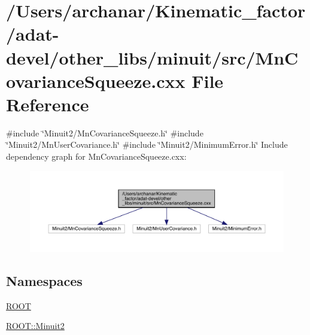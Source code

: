 \hypertarget{adat-devel_2other__libs_2minuit_2src_2MnCovarianceSqueeze_8cxx}{}\section{/\+Users/archanar/\+Kinematic\+\_\+factor/adat-\/devel/other\+\_\+libs/minuit/src/\+Mn\+Covariance\+Squeeze.cxx File Reference}
\label{adat-devel_2other__libs_2minuit_2src_2MnCovarianceSqueeze_8cxx}
{\ttfamily \#include \char`\"{}Minuit2/\+Mn\+Covariance\+Squeeze.\+h\char`\"{}}\newline
{\ttfamily \#include \char`\"{}Minuit2/\+Mn\+User\+Covariance.\+h\char`\"{}}\newline
{\ttfamily \#include \char`\"{}Minuit2/\+Minimum\+Error.\+h\char`\"{}}\newline
Include dependency graph for Mn\+Covariance\+Squeeze.\+cxx\+:
\nopagebreak
\begin{figure}[H]
\begin{center}
\leavevmode
\includegraphics[width=350pt]{d9/d09/adat-devel_2other__libs_2minuit_2src_2MnCovarianceSqueeze_8cxx__incl}
\end{center}
\end{figure}
\subsection*{Namespaces}
\begin{DoxyCompactItemize}
\item 
 \mbox{\hyperlink{namespaceROOT}{R\+O\+OT}}
\item 
 \mbox{\hyperlink{namespaceROOT_1_1Minuit2}{R\+O\+O\+T\+::\+Minuit2}}
\end{DoxyCompactItemize}
